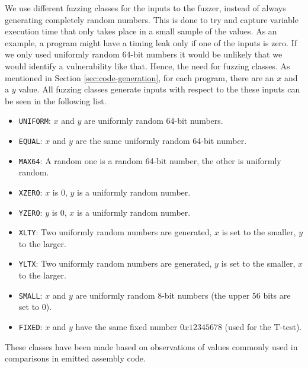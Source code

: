 We use different fuzzing classes for the inputs to the fuzzer, instead of always generating completely random numbers. 
This is done to try and capture variable execution time that only takes place in a small sample of the values. 
As an example, a program might have a timing leak only if one of the inputs is zero. 
If we only used uniformly random 64-bit numbers it would be unlikely that we would identify a vulnerability like that. 
Hence, the need for fuzzing classes. 
As mentioned in Section \ref{sec:code-generation}, for each program, there are an $x$ and a $y$ value. 
All fuzzing classes generate inputs with respect to the these inputs can be seen in the following list.
\begin{itemize}
    \item \texttt{UNIFORM}: $x$ and $y$ are uniformly random 64-bit numbers.
    \item \texttt{EQUAL}:  $x$ and $y$ are the same uniformly random 64-bit number.
    \item \texttt{MAX64}: A random one is a random 64-bit number, the other is uniformly random.
    \item \texttt{XZERO}: $x$ is 0, $y$ is a uniformly random number.
    \item \texttt{YZERO}: $y$ is 0, $x$ is a uniformly random number.
    \item \texttt{XLTY}: Two uniformly random numbers are generated, $x$ is set to the smaller, $y$ to the larger.
    \item \texttt{YLTX}: Two uniformly random numbers are generated, $y$ is set to the smaller, $x$ to the larger.
    \item \texttt{SMALL}: $x$ and $y$ are uniformly random 8-bit numbers (the upper 56 bits are set to 0).
    \item \texttt{FIXED}: $x$ and $y$ have the same fixed number $0x12345678$ (used for the T-test).
\end{itemize}
These classes have been made based on observations of values commonly used in comparisons in emitted assembly code.

